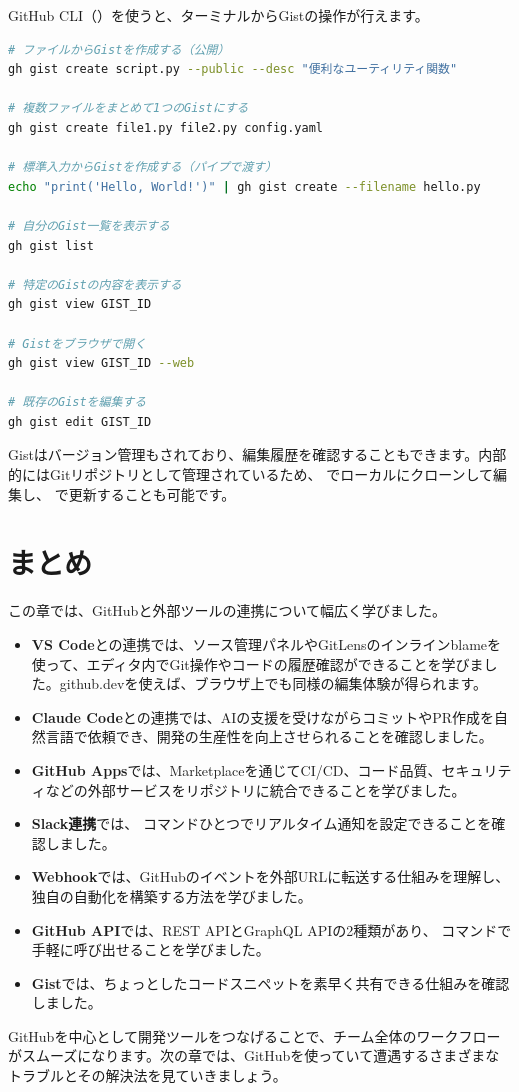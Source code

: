 GitHub CLI（）を使うと、ターミナルからGistの操作が行えます。

\begin{lstlisting}[language=bash]
# ファイルからGistを作成する（公開）
gh gist create script.py --public --desc "便利なユーティリティ関数"

# 複数ファイルをまとめて1つのGistにする
gh gist create file1.py file2.py config.yaml

# 標準入力からGistを作成する（パイプで渡す）
echo "print('Hello, World!')" | gh gist create --filename hello.py

# 自分のGist一覧を表示する
gh gist list

# 特定のGistの内容を表示する
gh gist view GIST_ID

# Gistをブラウザで開く
gh gist view GIST_ID --web

# 既存のGistを編集する
gh gist edit GIST_ID
\end{lstlisting}

Gistはバージョン管理もされており、編集履歴を確認することもできます。内部的にはGitリポジトリとして管理されているため、 でローカルにクローンして編集し、 で更新することも可能です。

\section{まとめ}

この章では、GitHubと外部ツールの連携について幅広く学びました。

\begin{itemize}
  \item \textbf{VS Code}との連携では、ソース管理パネルやGitLensのインラインblameを使って、エディタ内でGit操作やコードの履歴確認ができることを学びました。github.devを使えば、ブラウザ上でも同様の編集体験が得られます。
  \item \textbf{Claude Code}との連携では、AIの支援を受けながらコミットやPR作成を自然言語で依頼でき、開発の生産性を向上させられることを確認しました。
  \item \textbf{GitHub Apps}では、Marketplaceを通じてCI/CD、コード品質、セキュリティなどの外部サービスをリポジトリに統合できることを学びました。
  \item \textbf{Slack連携}では、 コマンドひとつでリアルタイム通知を設定できることを確認しました。
  \item \textbf{Webhook}では、GitHubのイベントを外部URLに転送する仕組みを理解し、独自の自動化を構築する方法を学びました。
  \item \textbf{GitHub API}では、REST APIとGraphQL APIの2種類があり、 コマンドで手軽に呼び出せることを学びました。
  \item \textbf{Gist}では、ちょっとしたコードスニペットを素早く共有できる仕組みを確認しました。
\end{itemize}

GitHubを中心として開発ツールをつなげることで、チーム全体のワークフローがスムーズになります。次の章では、GitHubを使っていて遭遇するさまざまなトラブルとその解決法を見ていきましょう。
